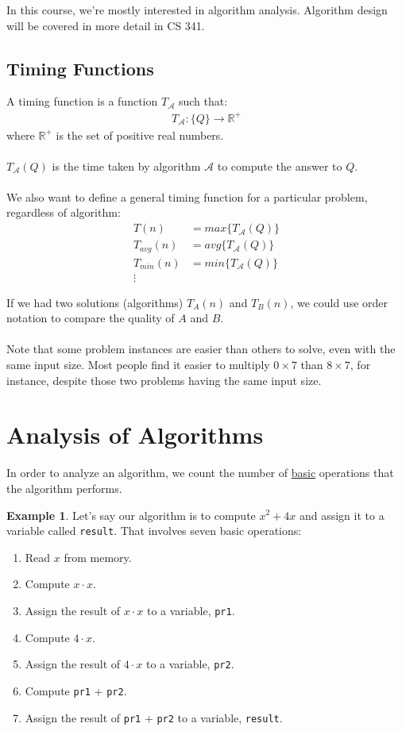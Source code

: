 \documentclass[]{article}
\theoremstyle{definition}
\newtheorem{ex}{Example}[section]
\begin{document}
		In this course, we're mostly interested in algorithm analysis. Algorithm design will be covered in more detail in CS 341.

		\subsection{Timing Functions}
			A timing function is a function $T_{\mathcal{A}}$ such that:
			\begin{align*}
				T_{\mathcal{A}}: \{ Q \} \to \mathbb{R}^{+}
			\end{align*}
			where $\mathbb{R}^{+}$ is the set of positive real numbers.
			\\ \\
			$T_{\mathcal{A}}(Q)$ is the time taken by algorithm $\mathcal{A}$ to compute the answer to $Q$.
			\\ \\
			We also want to define a general timing function for a particular problem, regardless of algorithm: 
			\begin{align*}
				T(n) &= max \{T_{ \mathcal{A}}(Q) \} \\ 
				T_{avg}(n) &= avg \{ T_{\mathcal{A}}(Q) \} \\ 
				T_{min}(n) &= min \{ T_{\mathcal{A}}(Q) \} \\
				\vdots&
			\end{align*}

			If we had two solutions (algorithms) $T_A(n)$ and $T_B(n)$, we could use order notation to compare the quality of $A$ and $B$.
			\\ \\
			Note that some problem instances are easier than others to solve, even with the same input size. Most people find it easier to multiply $0 \times 7$ than $8 \times 7$, for instance, despite those two problems having the same input size.
	\section{Analysis of Algorithms}
		In order to analyze an algorithm, we count the number of \underline{basic} operations that the algorithm performs.
		\begin{ex}
			Let's say our algorithm is to compute $x^2 + 4x$ and assign it to a variable called \verb+result+. That involves seven basic operations:
			\begin{enumerate}
				\item Read $x$ from memory.
				\item Compute $x \cdot x$.
				\item Assign the result of $x \cdot x$ to a variable, \verb+pr1+.
				\item Compute $4 \cdot x$.
				\item Assign the result of $4 \cdot x$ to a variable, \verb+pr2+.
				\item Compute \verb+pr1+ + \verb+pr2+.
				\item Assign the result of \verb+pr1+ + \verb+pr2+ to a variable, \verb+result+.
			\end{enumerate}
		\end{ex}
\end{document}
